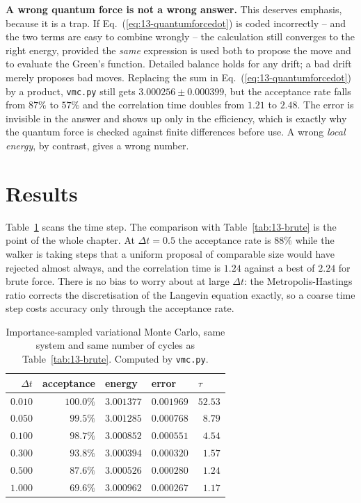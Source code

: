 \begin{notebox}
\textbf{A wrong quantum force is not a wrong answer.} This deserves emphasis,
because it is a trap.  If Eq.~(\ref{eq:13-quantumforcedot}) is coded
incorrectly -- and the two terms are easy to combine wrongly -- the
calculation still converges to the right energy, provided the \emph{same}
expression is used both to propose the move and to evaluate the Green's
function.  Detailed balance holds for any drift; a bad drift merely proposes
bad moves.  Replacing the sum in Eq.~(\ref{eq:13-quantumforcedot}) by a
product, \texttt{vmc.py} still gets $3.000256\pm0.000399$, but the acceptance
rate falls from $87\%$ to $57\%$ and the correlation time doubles from $1.21$
to $2.48$.  The error is invisible in the answer and shows up only in the
efficiency, which is exactly why the quantum force is checked against finite
differences before use.  A wrong \emph{local energy}, by contrast, gives a
wrong number.
\end{notebox}

\section{Results}
\label{sec:vmcresults}

Table~\ref{tab:13-importance} scans the time step.  The comparison with
Table~\ref{tab:13-brute} is the point of the whole chapter.  At
$\Delta t=0.5$ the acceptance rate is $88\%$ while the walker is taking steps
that a uniform proposal of comparable size would have rejected almost always,
and the correlation time is $1.24$ against a best of $2.24$ for brute force.
There is no bias to worry about at large $\Delta t$: the Metropolis-Hastings
ratio corrects the discretisation of the Langevin equation exactly, so a
coarse time step costs accuracy only through the acceptance rate.

\begin{table}[h]
\centering
\renewcommand{\arraystretch}{1.25}
\setlength{\tabcolsep}{11pt}
\begin{tabular}{rrlll}
\toprule
$\Delta t$ & acceptance & energy & error & $\tau$\\
\midrule
$0.010$ & $100.0\%$ & $3.001377$ & $0.001969$ & $52.53$\\
$0.050$ & $\phantom{0}99.5\%$ & $3.001285$ & $0.000768$ & $\phantom{0}8.79$\\
$0.100$ & $\phantom{0}98.7\%$ & $3.000852$ & $0.000551$ & $\phantom{0}4.54$\\
$0.300$ & $\phantom{0}93.8\%$ & $3.000394$ & $0.000320$ & $\phantom{0}1.57$\\
$0.500$ & $\phantom{0}87.6\%$ & $3.000526$ & $0.000280$ & $\phantom{0}1.24$\\
$1.000$ & $\phantom{0}69.6\%$ & $3.000962$ & $0.000267$ & $\phantom{0}1.17$\\
\bottomrule
\end{tabular}
\caption{Importance-sampled variational Monte Carlo, same system and same
number of cycles as Table~\ref{tab:13-brute}.  Computed by \texttt{vmc.py}.}
\label{tab:13-importance}
\end{table}

